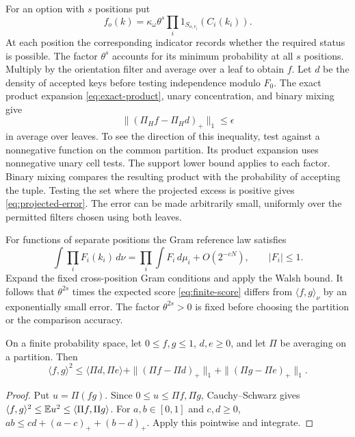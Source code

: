 For an option with \(s\) positions put
\[
 f_o(k)=\kappa_\omega\theta^s
             \prod_i1_{S_{o,v_i}}(C_i(k_i)).
\]
At each position the corresponding indicator records whether the
required status is possible. The factor \(\theta^s\) accounts for its
minimum probability at all \(s\) positions. Multiply by the orientation
filter and average over a leaf to obtain \(f\).
Let \(d\) be the density of accepted keys before testing independence modulo \(F_0\).
The exact product expansion \eqref{eq:exact-product}, unary concentration,
and binary mixing give
\begin{equation}\label{eq:projected-error}
 \|(\Pi_Hf-\Pi_Hd)_+\|_1\le\epsilon
\end{equation}
in average over leaves. To see the direction of this inequality, test
against a nonnegative function on the common partition. Its product
expansion uses nonnegative unary cell tests. The support lower bound
applies to each factor. Binary mixing compares the resulting product
with the probability of accepting the tuple. Testing the set where the projected excess is
positive gives \eqref{eq:projected-error}.
The error can be made arbitrarily small, uniformly over the permitted
filters chosen using both leaves.

For functions of separate positions the Gram reference law satisfies
\[
 \int\prod_iF_i(k_i)\,d\nu
   =\prod_i\int F_i\,d\mu_i+O(2^{-cN}),\qquad |F_i|\le1.
\]
Expand the fixed cross-position Gram conditions and apply the Walsh bound.
It follows that \(\theta^{2s}\) times the expected score
\eqref{eq:finite-score} differs from \(\langle f,g\rangle_\nu\)
by an exponentially small error. The factor \(\theta^{2s}>0\) is fixed
before choosing the partition or the comparison accuracy.

\begin{lemma}\label{lem:projected-mend}
On a finite probability space, let \(0\le f,g\le1\), \(d,e\ge0\),
and let \(\Pi\) be averaging on a partition. Then
\begin{equation}\label{eq:projected-mend}
 \langle f,g\rangle^2
 \le\langle\Pi d,\Pi e\rangle
       +\|(\Pi f-\Pi d)_+\|_1+\|(\Pi g-\Pi e)_+\|_1.
\end{equation}
\end{lemma}
\begin{proof}
Put \(u=\Pi(fg)\). Since \(0\le u\le\Pi f,\Pi g\),
Cauchy--Schwarz gives
\(\langle f,g\rangle^2\le\mathbb E u^2\le\langle\Pi f,\Pi g\rangle\).
For \(a,b\in[0,1]\) and \(c,d\ge0\),
\(ab\le cd+(a-c)_++(b-d)_+\). Apply this pointwise and integrate.
\end{proof}

